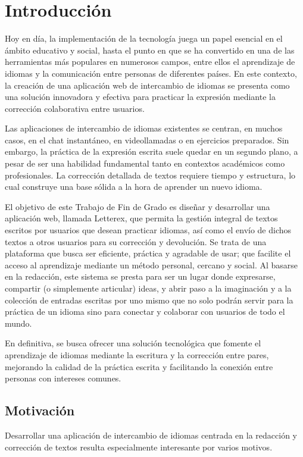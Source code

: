 \chapter{Introducción}
Hoy en día, la implementación de la tecnología juega un papel esencial en el ámbito educativo y social, hasta el punto en que se ha convertido en una de las herramientas más populares en numerosos campos, entre ellos el aprendizaje de idiomas y la comunicación entre personas de diferentes países. En este contexto, la creación de una aplicación web de intercambio de idiomas se presenta como una solución innovadora y efectiva para practicar la expresión mediante la corrección colaborativa entre usuarios.

Las aplicaciones de intercambio de idiomas existentes se centran, en muchos casos, en el chat instantáneo, en videollamadas o en ejercicios preparados. Sin embargo, la práctica de la expresión escrita suele quedar en un segundo plano, a pesar de ser una habilidad fundamental tanto en contextos académicos como profesionales. La corrección detallada de textos requiere tiempo y estructura, lo cual construye una base sólida a la hora de aprender un nuevo idioma.

El objetivo de este Trabajo de Fin de Grado es diseñar y desarrollar una aplicación web, llamada Letterex, que permita la gestión integral de textos escritos por usuarios que desean practicar idiomas, así como el envío de dichos textos a otros usuarios para su corrección y devolución. Se trata de una plataforma que busca ser eficiente, práctica y agradable de usar; que facilite el acceso al aprendizaje mediante un método personal, cercano y social. Al basarse en la redacción, este sistema se presta para ser un lugar donde expresarse, compartir (o simplemente articular) ideas, y abrir paso a la imaginación y a la colección de entradas escritas por uno mismo que no solo podrán servir para la práctica de un idioma sino para conectar y colaborar con usuarios de todo el mundo.

En definitiva, se busca ofrecer una solución tecnológica que fomente el aprendizaje de idiomas mediante la escritura y la corrección entre pares, mejorando la calidad de la práctica escrita y facilitando la conexión entre personas con intereses comunes.

\section{Motivación}
Desarrollar una aplicación de intercambio de idiomas centrada en la redacción y corrección de textos resulta especialmente interesante por varios motivos.

